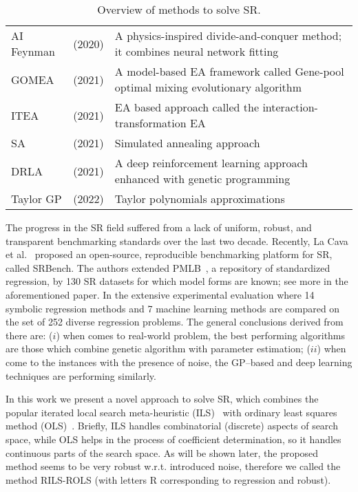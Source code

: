 \documentclass[a4paper,12pt]{elsarticle}
\begin{document}
\begin{table}[!ht]
{\begin{tabularx}{550pt}{l  l  X}
	       AI Feynman  & \cite{udrescu2020ai} (2020) & A physics-inspired divide-and-conquer method; it  combines neural network fitting \\
	             GOMEA  & \cite{virgolin2021improving} (2021)    & A model-based
	       EA framework called Gene-pool optimal mixing evolutionary algorithm \\
	       ITEA & \cite{de2021interaction} (2021)   & EA based approach called the interaction-transformation EA   \\
	       SA & \cite{kantor2021simulated} (2021) &  Simulated annealing approach \\
	       
         DRLA & \cite{mundhenk2021symbolic} (2021)  &    A deep reinforcement learning approach enhanced with genetic programming \\
            Taylor GP &  \cite{he2022taylor} (2022)  &  Taylor polynomials approximations  \\ \hline
         

	\end{tabularx} }
		\caption{Overview of methods to solve SR.}
		\label{tab:gp-based}
	\end{table}
 
  
	The progress in the SR field suffered from a lack of uniform, robust, and transparent
	benchmarking standards over the last two decade. Recently, La Cava et al.~\cite{la2021contemporary} proposed an
	open-source, reproducible benchmarking platform for SR, called SRBench. The authors extended  PMLB~\cite{olson2017pmlb},  a repository of standardized regression, by 130 SR datasets for which model forms are known; see more in the aforementioned paper. In the extensive experimental evaluation  where 14
	symbolic regression methods and 7 machine learning methods are compared on the  set of 252 diverse
    regression problems. The general conclusions derived from there are: ($i$) when comes to real-world problem, the best performing algorithms are those which combine genetic algorithm with parameter estimation; ($ii$) when come to the instances with the presence of noise, the GP--based and deep learning techniques are performing similarly. 
    
    In this work we present a novel approach to solve SR, which combines the popular iterated local search meta-heuristic (ILS)~\cite{lourencco2003iterated,lourencco2019iterated} with ordinary least squares method (OLS)~\cite{leng2007ordinary}. Briefly, ILS handles combinatorial (discrete) aspects of search space, while OLS helps in the process of coefficient determination, so it handles continuous parts of the search space. As will be shown later, the proposed method seems to be very robust w.r.t. introduced noise, therefore we called the method RILS-ROLS (with letters R corresponding to regression and robust).  
 
\end{document}
